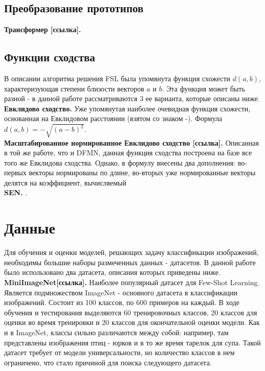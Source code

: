 \documentclass[a4paper, 12pt]{report}
\begin{document}
\subsection{Преобразование прототипов}

\textbf {Трансформер [ссылка].} 

\subsection{Функции сходства}

В описании алгоритма решения FSL была упомянута функция схожести $d(a, b)$, характеризующая степени близости векторов $a$ и $b$. Эта функция может быть разной - в данной работе рассматриваются 3 ее варианта, которые описаны ниже. \\

\textbf {Евклидово сходство.} Уже упомянутая наиболее очевидная функция схожести, основанная на Евклидовом расстоянии (взятом со знаком -). Формула $d(a, b) = -\sqrt{{(a - b)}^2}$.\\

\textbf {Масштабированное нормированное Евклидово сходство [ссылка].}  Описанная в той же работе, что и DFMN, данная функция сходства построена на базе все того же Евклидова сходства. Однако, в формулу внесены два дополнения: во-первых векторы нормированы по длине, во-вторых уже нормированные векторы делятся на коэффициент, вычисляемый  \\
\textbf {SEN.} . \\

\section {Данные}

Для обучения и оценки моделей, решающих задачу классификации изображений, необходимы большие наборы размеченных данных - датасетов. В данной работе было использовано два датасета, описания которых приведены ниже.\\

\textbf {MiniImageNet[ссылка].} Наиболее популярный датасет для Few-Shot Learning. Является подмножеством ImageNet - основного датасета в классификации изображений. Состоит из 100 классов, по 600 примеров на каждый. В ходе обучения и тестирования выделяются 60 тренировочных классов, 20 классов для оценки во время тренировки и 20 классов для окончательной оценки модели. Как и в ImageNet, классы сильно различаются между собой: например, там представлены изображения птиц - юрков и в то же время тарелок для супа. Такой датасет требует от модели универсальности, но количество классов в нем ограничено, что стало причиной для поиска следующего датасета. \\
\end{document}
